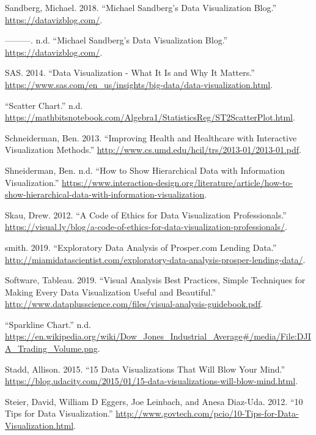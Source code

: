 \documentclass[]{book}
\begin{document}
\leavevmode\hypertarget{ref-sandberg_blog}{}%
Sandberg, Michael. 2018. ``Michael Sandberg's Data Visualization Blog.'' \url{https://datavizblog.com/}.

\leavevmode\hypertarget{ref-Michael_Sandberg_blog}{}%
---------. n.d. ``Michael Sandberg's Data Visualization Blog.'' \url{https://datavizblog.com/}.

\leavevmode\hypertarget{ref-why_dataviz_matters}{}%
SAS. 2014. ``Data Visualization - What It Is and Why It Matters.'' \url{https://www.sas.com/en_us/insights/big-data/data-visualization.html}.

\leavevmode\hypertarget{ref-scatter}{}%
``Scatter Chart.'' n.d. \url{https://mathbitsnotebook.com/Algebra1/StatisticsReg/ST2ScatterPlot.html}.

\leavevmode\hypertarget{ref-data_viz_healthcare}{}%
Schneiderman, Ben. 2013. ``Improving Health and Healthcare with Interactive Visualization Methods.'' \url{http://www.cs.umd.edu/hcil/trs/2013-01/2013-01.pdf}.

\leavevmode\hypertarget{ref-tier-chart}{}%
Shneiderman, Ben. n.d. ``How to Show Hierarchical Data with Information Visualization.'' \url{https://www.interaction-design.org/literature/article/how-to-show-hierarchical-data-with-information-visualization}.

\leavevmode\hypertarget{ref-ethics_code}{}%
Skau, Drew. 2012. ``A Code of Ethics for Data Visualization Professionals.'' \url{https://visual.ly/blog/a-code-of-ethics-for-data-visualization-professionals/}.

\leavevmode\hypertarget{ref-david_2019}{}%
smith. 2019. ``Exploratory Data Analysis of Prosper.com Lending Data.'' \url{http://miamidatascientist.com/exploratory-data-analysis-prosper-lending-data/}.

\leavevmode\hypertarget{ref-analyze_viz}{}%
Software, Tableau. 2019. ``Visual Analysis Best Practices, Simple Techniques for Making Every Data Visualization Useful and Beautiful.'' \url{http://www.dataplusscience.com/files/visual-analysis-guidebook.pdf}.

\leavevmode\hypertarget{ref-sparklines}{}%
``Sparkline Chart.'' n.d. \url{https://en.wikipedia.org/wiki/Dow_Jones_Industrial_Average\#/media/File:DJIA_Trading_Volume.png}.

\leavevmode\hypertarget{ref-15_mindblowing}{}%
Stadd, Allison. 2015. ``15 Data Visualizations That Will Blow Your Mind.'' \url{https://blog.udacity.com/2015/01/15-data-visualizations-will-blow-mind.html}.

\leavevmode\hypertarget{ref-Steier}{}%
Steier, David, William D Eggers, Joe Leinbach, and Anesa Diaz-Uda. 2012. ``10 Tips for Data Visualization.'' \url{http://www.govtech.com/pcio/10-Tips-for-Data-Visualization.html}.
\end{document}
